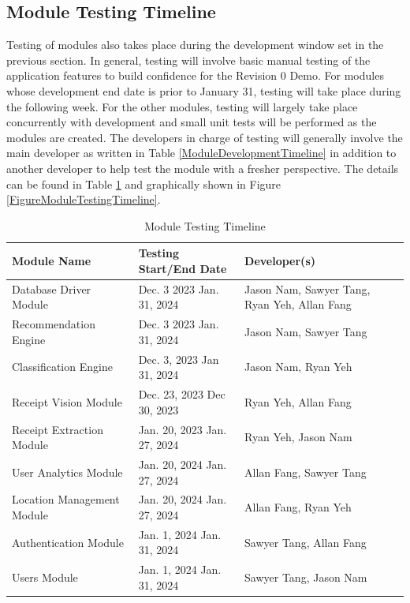 \documentclass[12pt, titlepage]{article}
\begin{document}
\subsection{Module Testing Timeline}

Testing of modules also takes place during the development window set in the previous section. In general,
testing will involve basic manual testing of the application features to build confidence for the
Revision 0 Demo. For modules whose development end date is prior to January 31, testing will take place
during the following week. For the other modules, testing will largely take place concurrently with development
and small unit tests will be performed as the modules are created. The developers in charge of testing will
generally involve the main developer as written in Table \ref{ModuleDevelopmentTimeline} in addition to another developer
to help test the module with a fresher perspective. The details can be found in Table \ref{ModuleTestingTimeline} and graphically shown
in Figure \ref{FigureModuleTestingTimeline}.

\begin{table}[H]
  \caption{Module Testing Timeline}\label{ModuleTestingTimeline}
  \begin{tabular}{|p{}|p{}|p{}|}
    \hline
    \textbf{Module Name} & \textbf{Testing Start/End Date} & \textbf{Developer(s)} \\
    \hline
    Database Driver Module & Dec. 3 2023 \textemdash{} Jan. 31, 2024 & Jason Nam, Sawyer Tang, Ryan Yeh, Allan Fang \\
    \hline
    Recommendation Engine & Dec. 3 2023 \textemdash{} Jan. 31, 2024 & Jason Nam, Sawyer Tang \\
    \hline
    Classification Engine & Dec. 3, 2023 \textemdash{} Jan 31, 2024 & Jason Nam, Ryan Yeh\\
    \hline
    Receipt Vision Module & Dec. 23, 2023 \textemdash{} Dec 30, 2023 & Ryan Yeh, Allan Fang \\
    \hline
    Receipt Extraction Module & Jan. 20, 2023 \textemdash{} Jan. 27, 2024 & Ryan Yeh, Jason Nam \\
    \hline
    User Analytics Module & Jan. 20, 2024 \textemdash{} Jan. 27, 2024 & Allan Fang, Sawyer Tang \\
    \hline
    Location Management Module & Jan. 20, 2024 \textemdash{} Jan. 27, 2024 & Allan Fang, Ryan Yeh \\
    \hline
    Authentication Module & Jan. 1, 2024 \textemdash{} Jan. 31, 2024 & Sawyer Tang, Allan Fang \\
    \hline
    Users Module & Jan. 1, 2024 \textemdash{} Jan. 31, 2024 & Sawyer Tang, Jason Nam \\
    \hline
  \end{tabular}
\end{table}
\end{document}
